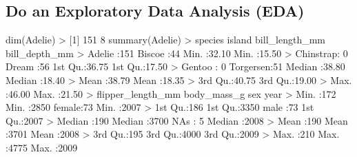 \documentclass[
  letterpaper,
]{book}
\newenvironment{Shaded}{\begin{snugshade}}{\end{snugshade}}
\newcommand{\DecValTok}[1]{\textcolor[rgb]{0.68,0.00,0.00}{#1}}
\newcommand{\FloatTok}[1]{\textcolor[rgb]{0.68,0.00,0.00}{#1}}
\newcommand{\FunctionTok}[1]{\textcolor[rgb]{0.28,0.35,0.67}{#1}}
\newcommand{\NormalTok}[1]{\textcolor[rgb]{0.00,0.23,0.31}{#1}}
\newcommand{\SpecialCharTok}[1]{\textcolor[rgb]{0.37,0.37,0.37}{#1}}
\newcommand{\StringTok}[1]{\textcolor[rgb]{0.13,0.47,0.30}{#1}}
\begin{document}
\subsection{Do an Exploratory Data Analysis
(EDA)}\label{do-an-exploratory-data-analysis-eda-1}

\begin{Shaded}
\begin{Highlighting}[]
\FunctionTok{dim}\NormalTok{(Adelie)}
\SpecialCharTok{\textgreater{}}\NormalTok{ [}\DecValTok{1}\NormalTok{] }\DecValTok{151}   \DecValTok{8}
\FunctionTok{summary}\NormalTok{(Adelie)}
\SpecialCharTok{\textgreater{}}\NormalTok{       species          island   bill\_length\_mm  bill\_depth\_mm  }
\SpecialCharTok{\textgreater{}}\NormalTok{  Adelie   }\SpecialCharTok{:}\DecValTok{151}\NormalTok{   Biscoe   }\SpecialCharTok{:}\DecValTok{44}\NormalTok{   Min.   }\SpecialCharTok{:}\FloatTok{32.10}\NormalTok{   Min.   }\SpecialCharTok{:}\FloatTok{15.50}  
\SpecialCharTok{\textgreater{}}\NormalTok{  Chinstrap}\SpecialCharTok{:}  \DecValTok{0}\NormalTok{   Dream    }\SpecialCharTok{:}\DecValTok{56}   \DecValTok{1}\NormalTok{st Qu.}\SpecialCharTok{:}\FloatTok{36.75}   \DecValTok{1}\NormalTok{st Qu.}\SpecialCharTok{:}\FloatTok{17.50}  
\SpecialCharTok{\textgreater{}}\NormalTok{  Gentoo   }\SpecialCharTok{:}  \DecValTok{0}\NormalTok{   Torgersen}\SpecialCharTok{:}\DecValTok{51}\NormalTok{   Median }\SpecialCharTok{:}\FloatTok{38.80}\NormalTok{   Median }\SpecialCharTok{:}\FloatTok{18.40}  
\SpecialCharTok{\textgreater{}}\NormalTok{                                 Mean   }\SpecialCharTok{:}\FloatTok{38.79}\NormalTok{   Mean   }\SpecialCharTok{:}\FloatTok{18.35}  
\SpecialCharTok{\textgreater{}}                                 \DecValTok{3}\NormalTok{rd Qu.}\SpecialCharTok{:}\FloatTok{40.75}   \DecValTok{3}\NormalTok{rd Qu.}\SpecialCharTok{:}\FloatTok{19.00}  
\SpecialCharTok{\textgreater{}}\NormalTok{                                 Max.   }\SpecialCharTok{:}\FloatTok{46.00}\NormalTok{   Max.   }\SpecialCharTok{:}\FloatTok{21.50}  
\SpecialCharTok{\textgreater{}}\NormalTok{  flipper\_length\_mm  body\_mass\_g       sex          year     }
\SpecialCharTok{\textgreater{}}\NormalTok{  Min.   }\SpecialCharTok{:}\DecValTok{172}\NormalTok{       Min.   }\SpecialCharTok{:}\DecValTok{2850}\NormalTok{   female}\SpecialCharTok{:}\DecValTok{73}\NormalTok{   Min.   }\SpecialCharTok{:}\DecValTok{2007}  
\SpecialCharTok{\textgreater{}}  \DecValTok{1}\NormalTok{st Qu.}\SpecialCharTok{:}\DecValTok{186}       \DecValTok{1}\NormalTok{st Qu.}\SpecialCharTok{:}\DecValTok{3350}\NormalTok{   male  }\SpecialCharTok{:}\DecValTok{73}   \DecValTok{1}\NormalTok{st Qu.}\SpecialCharTok{:}\DecValTok{2007}  
\SpecialCharTok{\textgreater{}}\NormalTok{  Median }\SpecialCharTok{:}\DecValTok{190}\NormalTok{       Median }\SpecialCharTok{:}\DecValTok{3700}\NormalTok{   NA}\StringTok{\textquotesingle{}s  : 5   Median :2008  }
\StringTok{\textgreater{}  Mean   :190       Mean   :3701               Mean   :2008  }
\StringTok{\textgreater{}  3rd Qu.:195       3rd Qu.:4000               3rd Qu.:2009  }
\StringTok{\textgreater{}  Max.   :210       Max.   :4775               Max.   :2009}
\end{Highlighting}
\end{Shaded}
\end{document}
